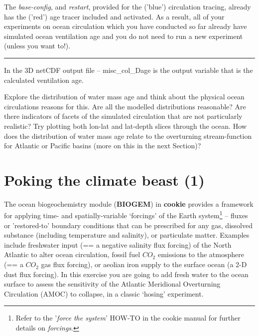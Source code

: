 The \textit{base-config}, and \textit{restart}, provided for the ('blue') circulation tracing, already has the ('red') age tracer included and activated. As a result, all of your experiments on ocean circulation which you have conducted so far already have simulated ocean ventilation age and you do not need to run a new experiment (unless you want to!).

\vspace{1mm}\noindent\rule{4cm}{0.5pt}\vspace{2mm}

\noindent In the 3D netCDF output file -- \textsf{\footnotesize misc\_col\_Dage} is the output variable that is the calculated ventilation age.

Explore the distribution of water mass age and think about the physical ocean circulations reasons for this. Are all the modelled distributions reasonable? Are there indicators of facets of the simulated circulation that are not particularly realistic? Try plotting both lon-lat and lat-depth slices through the ocean. How does the distribution of water mass age relate to the overturning stream-function for Atlantic or Pacific basins (more on this in the next Section)?

\newpage

\section{Poking the climate beast (1)}

The ocean biogeochemistry module (\textbf{BIOGEM}) in \textbf{cookie} provides a framework for applying time- and spatially-variable ‘forcings’ of the Earth system\footnote{Refer to the '\textit{force the system}' \textsf{HOW-TO} in the cookie manual for further details on \textit{forcings}.} – fluxes or 'restored-to' boundary conditions that can be prescribed for any gas, dissolved substance (including temperature and salinity), or particulate matter. Examples include freshwater input (== a negative salinity flux forcing) of the North Atlantic to alter ocean circulation, fossil fuel \(CO_{2}\) emissions to the atmosphere (== a \(CO_{2}\) gas flux forcing), or aeolian iron supply to the surface ocean (a 2-D dust flux forcing). In this exercise you are going to add fresh water to the ocean surface to assess the sensitivity of the Atlantic Meridional Overturning Circulation (AMOC) to collapse, in a classic ‘hosing’ experiment. 

